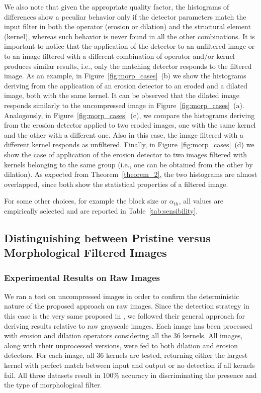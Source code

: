 \documentclass{ieeeaccess}
\begin{document}
We also note that given the appropriate quality factor, the histograms of differences show a peculiar behavior only if the detector parameters match the input filter in both the operator (erosion or dilation) and the structural element (kernel), whereas such behavior is never found in all the other combinations. It is important to notice that the application of the detector to an unfiltered image or to an image filtered with a different combination of operator and/or kernel produces similar results, i.e., only the matching detector responds to the filtered image. As an example, in Figure~\ref{fig:morp_cases}~(b) we show the histograms deriving from the application of an erosion detector to an eroded and a dilated image, both with the same kernel. It can be observed that the dilated image responds similarly to the uncompressed image in Figure~\ref{fig:morp_cases}~(a). Analogously, in Figure~\ref{fig:morp_cases}~(c), we compare the histograms deriving from the erosion detector applied to two eroded images, one with the same kernel and the other with a different one. Also in this case, the image filtered with a different kernel responds as unfiltered. Finally, in Figure~\ref{fig:morp_cases}~(d) we show the case of application of the erosion detector to two images filtered with kernels belonging to the same group (i.e., one can be obtained from the other by dilation). As expected from Theorem~\ref{theorem_2}, the two histograms are almost overlapped, since both show the statistical properties of a filtered image.

For some other choices, for example the block size or $\alpha_{th}$, all values are empirically selected and are reported in Table~\ref{tab:sensibility}. 

\subsection{Distinguishing between Pristine versus Morphological Filtered Images}
\label{sec:compr_res}

\subsubsection{Experimental Results on Raw Images}

We ran a test on uncompressed images in order to confirm the deterministic nature of the proposed approach on raw images. Since the detection strategy in this case is the very same proposed in \cite{de2017detecting}, we followed their general approach for deriving results relative to raw grayscale images. Each image has been processed with erosion and dilation operators considering all the 36 kernels.
All images, along with their unprocessed versions, were fed to both dilation and erosion detectors. For each image, all 36 kernels are tested, returning either the largest kernel with perfect match between input and output or no detection if all kernels fail. All three datasets result in 100\% accuracy in discriminating the presence and the type of morphological filter.%
\end{document}

